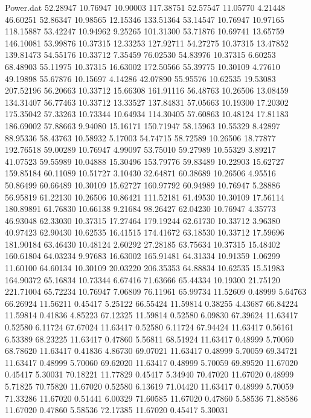 \begin{filecontents}{Power.dat}
  52.28947   10.76947   10.90003  117.38751
  52.57547   11.05770    4.21448   46.60251
  52.86347   10.98565   12.15346  133.51364
  53.14547   10.76947   10.97165  118.15887
  53.42247   10.94962    9.25265  101.31300
  53.71876   10.69741   13.65759  146.10081
  53.99876   10.37315   12.33253  127.92711
  54.27275   10.37315   13.47852  139.81473
  54.55176   10.33712    7.35459   76.02530
  54.83976   10.37315    6.60253   68.48903
  55.11975   10.37315   16.63002  172.50566
  55.39775   10.30109    4.77610   49.19898
  55.67876   10.15697    4.14286   42.07890
  55.95576   10.62535   19.53083  207.52196
  56.20663   10.33712   15.66308  161.91116
  56.48763   10.26506   13.08459  134.31407
  56.77463   10.33712   13.33527  137.84831
  57.05663   10.19300   17.20302  175.35042
  57.33263   10.73344   10.64934  114.30405
  57.60863   10.48124   17.81183  186.69002
  57.88663    9.94080   15.16171  150.71947
  58.15963   10.55329    8.42897   88.95336
  58.43763   10.58932    5.17003   54.74715
  58.72589   10.26506   18.77877  192.76518
  59.00289   10.76947    4.99097   53.75010
  59.27989   10.55329    3.89217   41.07523
  59.55989   10.04888   15.30496  153.79776
  59.83489   10.22903   15.62727  159.85184
  60.11089   10.51727    3.10430   32.64871
  60.38689   10.26506    4.95516   50.86499
  60.66489   10.30109   15.62727  160.97792
  60.94989   10.76947    5.28886   56.95819
  61.22130   10.26506   10.86421  111.52181
  61.49530   10.30109   17.56114  180.89891
  61.76830   10.66138    9.21684   98.26427
  62.04230   10.76947    4.35773   46.93048
  62.33030   10.37315   17.27464  179.19244
  62.61730   10.33712    3.96380   40.97423
  62.90430   10.62535   16.41515  174.41672
  63.18530   10.33712   17.59696  181.90184
  63.46430   10.48124    2.60292   27.28185
  63.75634   10.37315   15.48402  160.61804
  64.03234    9.97683   16.63002  165.91481
  64.31334   10.91359    1.06299   11.60100
  64.60134   10.30109   20.03220  206.35353
  64.88834   10.62535   15.51983  164.90372
  65.16834   10.73344    6.67416   71.63666
  65.44334   10.19300   21.75120  221.71004
  65.72234   10.76947    7.06809   76.11961
  65.99734   11.52609    0.48999    5.64763
  66.26924   11.56211    0.45417    5.25122
  66.55424   11.59814    0.38255    4.43687
  66.84224   11.59814    0.41836    4.85223
  67.12325   11.59814    0.52580    6.09830
  67.39624   11.63417    0.52580    6.11724
  67.67024   11.63417    0.52580    6.11724
  67.94424   11.63417    0.56161    6.53389
  68.23225   11.63417    0.47860    5.56811
  68.51924   11.63417    0.48999    5.70060
  68.78620   11.63417    0.41836    4.86730
  69.07021   11.63417    0.48999    5.70059
  69.34721   11.63417    0.48999    5.70060
  69.62020   11.63417    0.48999    5.70059
  69.89520   11.67020    0.45417    5.30031
  70.18221   11.77829    0.45417    5.34940
  70.47020   11.67020    0.48999    5.71825
  70.75820   11.67020    0.52580    6.13619
  71.04420   11.63417    0.48999    5.70059
  71.33286   11.67020    0.51441    6.00329
  71.60585   11.67020    0.47860    5.58536
  71.88586   11.67020    0.47860    5.58536
  72.17385   11.67020    0.45417    5.30031
\end{filecontents}
